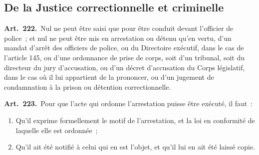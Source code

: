 \documentclass[french,twoside]{book} %
\newcommand{\labelchar}[1]{\textbf{\color{rubric} #1}}
\begin{document}
\subsection[{De la Justice correctionnelle et criminelle}]{De la Justice correctionnelle et criminelle}

\labelchar{Art. 222.} Nul ne peut être saisi que pour être conduit devant l’officier de police ; et nul ne peut être mis en arrestation ou détenu qu’en vertu, d’un mandat d’arrêt des officiers de police, ou du Directoire exécutif, dans le cas de l’article 145, ou d’une ordonnance de prise de corps, soit d’un tribunal, soit du directeur du jury d’accusation, ou d’un décret d’accusation du Corps législatif, dans le cas où il lui appartient de la prononcer, ou d’un jugement de condamnation à la prison ou détention correctionnelle.\par
\labelchar{Art. 223.} Pour que l’acte qui ordonne l’arrestation puisse être exécuté, il faut :\par

\begin{enumerate}[itemsep=0pt,topsep=0pt,partopsep=0pt,parskip=0pt]
\item Qu’il exprime formellement le motif de l’arrestation, et la loi en conformité de laquelle elle est ordonnée ;
\item Qu’il ait été notifié à celui qui en est l’objet, et qu’il lui en ait été laissé copie.
\end{enumerate}
\end{document}

